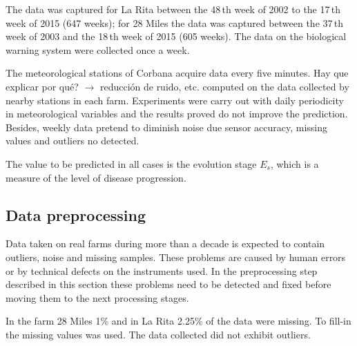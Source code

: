 The data was captured for La Rita between the 48\,th week of
2002 to the 17\,th week of 2015 (647 weeks); for 28 Miles the
data was captured between the 37\,th week of 2003 and the
18\,th week of 2015 (605 weeks).
%
The data on the biological warning system were collected once a
week.

The meteorological stations of Corbana acquire data every five
minutes.
%
{Hay que explicar por qué? $\rightarrow$ reducción de ruido, etc.}
%
computed on the data collected by nearby stations in each farm. Experiments were carry out with daily periodicity in meteorological variables and the results proved do not improve the prediction. Besides, weekly data pretend to diminish noise due sensor accuracy, missing values and outliers no detected.


The value to be predicted in all cases is the evolution stage $E_s$,
which is a measure of the level of disease progression.

\subsection{Data preprocessing}

Data taken on real farms during more than a decade is expected to
contain outliers, noise and missing samples.  These problems are
caused by human errors or by technical defects on the instruments
used.  
%
In the preprocessing step described in this section these problems
need to be detected and fixed before moving them to the next
processing stages.

In the farm 28 Miles 1\% and in La Rita 2.25\% of the data were missing.
%
To fill-in the missing values  was used.
%
The data collected did not exhibit outliers.

